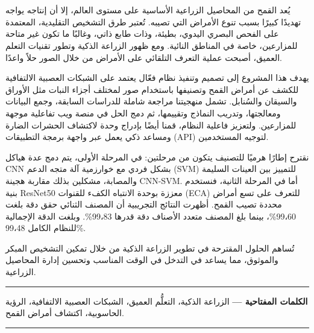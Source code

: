 
\cleardoublepage
{}
\chapter*{\Huge\bfseries\hfill{}}
\thispagestyle{noheader}



\vspace{0.1cm}





\vspace{0.1cm}
\begin{RLtext}

يُعد القمح من المحاصيل الزراعية الأساسية على مستوى العالم، إلا أن إنتاجه يواجه تهديدًا كبيرًا بسبب تنوع الأمراض التي تصيبه. تُعتبر طرق التشخيص التقليدية، المعتمدة على الفحص البصري اليدوي، بطيئة، وذات طابع ذاتي، وغالبًا ما تكون غير متاحة للمزارعين، خاصة في المناطق النائية. ومع ظهور الزراعة الذكية وتطور تقنيات التعلم العميق، أصبحت عملية التعرف التلقائي على الأمراض من خلال الصور حلاً واعدًا.

يهدف هذا المشروع إلى تصميم وتنفيذ نظام فعّال يعتمد على الشبكات العصبية الالتفافية \CNN للكشف عن أمراض القمح وتصنيفها باستخدام صور لمختلف أجزاء النبات مثل الأوراق والسيقان والسُنابل. تشمل منهجيتنا مراجعة شاملة للدراسات السابقة، وجمع البيانات ومعالجتها، وتدريب النماذج وتقييمها، ثم دمج الحل في منصة ويب تفاعلية موجهة للمزارعين. ولتعزيز فاعلية النظام، قمنا أيضًا بإدراج وحدة لاكتشاف الحشرات الضارة ومساعد ذكي يعمل عبر واجهة برمجة التطبيقات (API) لتوجيه المستخدمين.

نقترح إطارًا هرميًا للتصنيف يتكون من مرحلتين: في المرحلة الأولى، يتم دمج عدة هياكل CNN بشكل فردي مع خوارزمية آلة متجه الدعم (SVM) للتمييز بين العينات السليمة والمصابة، مشكلين بذلك مقاربة هجينة CNN-SVM. أما في المرحلة الثانية، فنستخدم بنية ResNet50 معززة بوحدة الانتباه الكفء للقنوات (ECA) للتعرف على تسع أمراض محددة تصيب القمح. أظهرت النتائج التجريبية أن المصنف الثنائي حقق دقة بلغت 99{،}60\%، بينما بلغ المصنف متعدد الأصناف دقة قدرها 99{،}83\%. وبلغت الدقة الإجمالية للنظام الكامل 99{،}48\%.

تُساهم الحلول المقترحة في تطوير الزراعة الذكية من خلال تمكين التشخيص المبكر والموثوق، مما يساعد في التدخل في الوقت المناسب وتحسين إدارة المحاصيل الزراعية.

\end{RLtext}

\vspace{0.1cm}
\hspace*{0mm}\rule{\linewidth}{1pt}
\vspace{0.1cm}
\begin{RLtext}
\noindent\textbf{الكلمات المفتاحية —} الزراعة الذكية، التعلُّم العميق، الشبكات العصبية الالتفافية، الرؤية الحاسوبية، اكتشاف أمراض القمح.
\end{RLtext}
\vspace{0.1cm}
\rule{\linewidth}{1pt}


